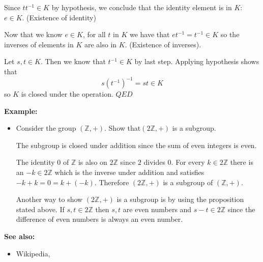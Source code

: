 \documentclass{article}
\begin{document}
Since $tt^{-1}\in K$ by hypothesis, we conclude that the identity element is in $K$: $e\in K$. (Existence of identity)

Now that we know $e\in K$, for all $t$ in $K$ we have that $et^{-1}=t^{-1}\in K$ so the inverses of elements in $K $ are also in $K$. (Existence of inverses).

Let $s,t\in K$. Then we know that $t^{-1}\in K$ by last step. Applying hypothesis shows that
$$s(t^{-1})^{-1} = st\in K$$
so $K$ is closed under the operation. $QED$

\textbf{Example:}
\begin{itemize}
  \item Consider the group $(\mathbb{Z}, +)$.  Show that$(2\mathbb{Z}, +)$ is a subgroup. 

The subgroup is closed under addition since the  sum of even integers is even. 

The identity $0$ of $\mathbb{Z}$ is also on $2\mathbb{Z}$ since $2$ divides $0$.
For every $k \in 2\mathbb{Z}$ there is an $-k \in  2\mathbb{Z}$ which is the inverse under addition and satisfies $-k+k = 0 =
  k+(-k)$.  Therefore $(2\mathbb{Z}, +)$ is a subgroup of $(\mathbb{Z},  +)$.

 Another way to show $(2\mathbb{Z}, +)$ is a subgroup
  is by using the proposition stated above.  If $s,t \in
  2\mathbb{Z}$ then $s,t$ are even numbers and $s-t\in
  2\mathbb{Z}$ since the difference of even numbers is always an even number.
\end{itemize}

\textbf{See also:}
\begin{itemize}
\item Wikipedia, 
\end{itemize}
\end{document}
